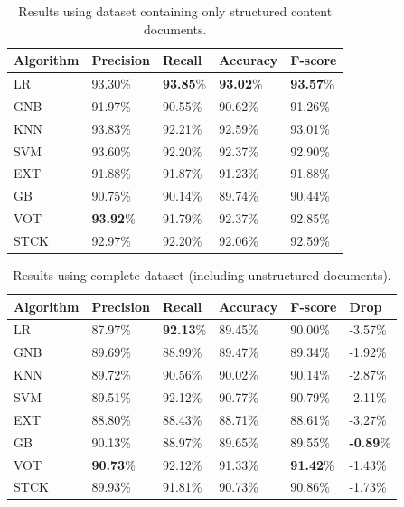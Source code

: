 \begin{table}[h]
\centering
\caption{Results using dataset containing only structured content documents.}
\label{tab:result}
\begin{tabular}{| l | l | l | l | l |}
\hline
Algorithm & Precision & Recall & Accuracy & F-score \\ \hline
LR   & 93.30\% & \textbf{93.85}\% & \textbf{93.02}\% & \textbf{93.57}\% \\
GNB  & 91.97\% & 90.55\% & 90.62\% & 91.26\% \\
KNN  & 93.83\% & 92.21\% & 92.59\% & 93.01\% \\
SVM  & 93.60\% & 92.20\% & 92.37\% & 92.90\% \\
EXT  & 91.88\% & 91.87\% & 91.23\% & 91.88\% \\
GB   & 90.75\% & 90.14\% & 89.74\% & 90.44\% \\
VOT  & \textbf{93.92}\% & 91.79\% & 92.37\% & 92.85\% \\
STCK & 92.97\% & 92.20\% & 92.06\% & 92.59\% \\
\hline
\end{tabular}
\end{table}

\begin{table}[h]
\centering
\caption{Results using complete dataset (including unstructured documents).}
\label{tab:resultnoise}
\begin{tabular}{| l | l | l | l | l | l |}
\hline
Algorithm & Precision & Recall & Accuracy & F-score & Drop \\ \hline
LR   & 87.97\% & \textbf{92.13}\% & 89.45\% & 90.00\% & -3.57\% \\
GNB  & 89.69\% & 88.99\% & 89.47\% & 89.34\% & -1.92\% \\
KNN  & 89.72\% & 90.56\% & 90.02\% & 90.14\% & -2.87\% \\
SVM  & 89.51\% & 92.12\% & 90.77\% & 90.79\% & -2.11\% \\
EXT  & 88.80\% & 88.43\% & 88.71\% & 88.61\% & -3.27\% \\
GB   & 90.13\% & 88.97\% & 89.65\% & 89.55\% & \textbf{-0.89}\% \\
VOT  & \textbf{90.73}\% & 92.12\% & 91.33\% & \textbf{91.42}\% & -1.43\% \\
STCK & 89.93\% & 91.81\% & 90.73\% & 90.86\% & -1.73\% \\
\hline
\end{tabular}
\end{table}

